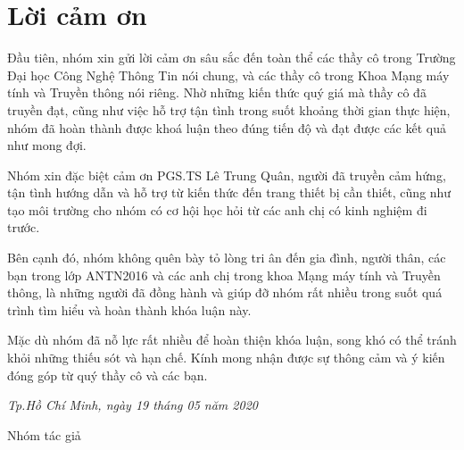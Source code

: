 \chapter*{\centering Lời cảm ơn}
Đầu tiên, nhóm xin gửi lời cảm ơn sâu sắc đến toàn thể các thầy cô trong Trường Đại học Công Nghệ Thông Tin nói chung, và các thầy cô trong Khoa Mạng máy tính và Truyền thông nói riêng. Nhờ những kiến thức quý giá mà thầy cô đã truyền đạt, cũng như việc hỗ trợ tận tình trong suốt khoảng thời gian thực hiện, nhóm đã hoàn thành được khoá luận theo đúng tiến độ và đạt được các kết quả như mong đợi.

Nhóm xin đặc biệt cảm ơn PGS.TS Lê Trung Quân, người đã truyền cảm hứng, tận tình hướng dẫn và hỗ trợ từ kiến thức đến trang thiết bị cần thiết, cũng như tạo môi trường cho nhóm có cơ hội học hỏi từ các anh chị có kinh nghiệm đi trước. 

Bên cạnh đó, nhóm không quên bày tỏ lòng tri ân đến gia đình, người thân, các bạn trong lớp ANTN2016 và các anh chị trong khoa Mạng máy tính và Truyền thông, là những người đã đồng hành và giúp đỡ nhóm rất nhiều trong suốt quá trình tìm hiểu và hoàn thành khóa luận này.

Mặc dù nhóm đã nỗ lực rất nhiều để hoàn thiện khóa luận, song khó có thể tránh khỏi những thiếu sót và hạn chế. Kính mong nhận được sự thông cảm và ý kiến đóng góp từ quý thầy cô và các bạn.
\vspace{1cm}
\begin{flushright}\textit{Tp.Hồ Chí Minh, ngày 19 tháng 05 năm 2020}\end{flushright}
\vspace{-1.1cm}
\begin{center}\hspace{8cm}Nhóm tác giả\end{center}
